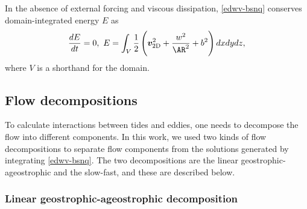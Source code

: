 \documentclass[../Rajarshi-thesis-draft.tex]{subfiles}
\begin{document}
In the absence of external forcing and viscous dissipation, \eqref{edwv-bsnq} conserves domain-integrated energy $E$ as 
\begin{equation}
    \label{edwv-en}
    \dd{E}{t}=0, \ E= \int_V \frac{1}{2} \left(  \vec{v}_{\rm 2D}^2+  \frac{w^2}{\AR^2} +  b^2 \right) dx dy dz ,
\end{equation}
where $V$ is a shorthand for the domain.






\subsection{Flow decompositions} \label{edwv-dcmp}
To calculate interactions between tides and eddies, one needs to decompose the flow into  different  components.  In this work, we used two kinds of flow decompositions to separate flow components from the solutions generated by integrating \eqref{edwv-bsnq}. The two decompositions are the linear geostrophic-ageostrophic and the slow-fast, and these are described below. 


\subsubsection{Linear geostrophic-ageostrophic decomposition} \label{edwv-budcmp}
\end{document}
